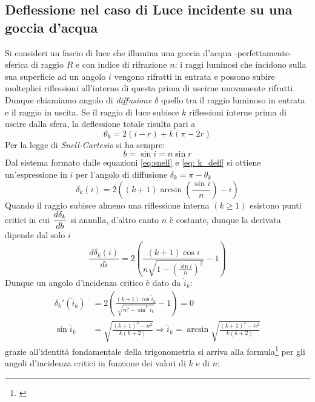 \documentclass{report}[a4paper,11pt]
\begin{document}
\subsection{Deflessione nel caso di Luce incidente su una goccia d'acqua}
Si consideri un fascio di luce che illumina una goccia d'acqua -perfettamente- sferica di raggio $R$ e con indice di rifrazione $n$: i raggi luminosi che incidono sulla sua superficie ad un angolo $i$ vengono rifratti in entrata e possono subire molteplici riflessioni all'interno di questa prima di uscirne nuovamente rifratti.
Dunque chiamiamo angolo di \emph{diffusione} $\delta$ quello tra il raggio luminoso in entrata e il raggio in uscita. 
Se il raggio di luce subisce $k$ riflessioni interne prima di uscire dalla sfera, la deflessione totale risulta pari a \begin{equation}\label{eq: k_defl}
\theta_k = 2(i-r) + k (\pi - 2r)
\end{equation}
Per la legge di \emph{Snell-Cartesio} si ha sempre:
\begin{equation}\label{eq:snell}
b = \sin{i} = n \sin{r}
\end{equation}
Dal sistema formato dalle equazioni \eqref{eq:snell} e \eqref{eq: k_defl} si ottiene un'espressione in $i$ per l'angolo di diffusione $\delta_k = \pi - \theta_k$
\begin{equation}\label{eq: defl(iota)}
\delta_k(i) = 2\left( (k+1)\arcsin \left(\frac{\sin{i}}{n}\right) -i \right)
\end{equation}
Quando il raggio subisce almeno una riflessione interna $(k\geq 1)$ esistono punti critici in cui $\mathlarger{\frac{d\delta_k}{db}}$ si annulla, d'altro canto $n$ è costante, dunque la derivata dipende dal solo $i$
\begin{equation}
\frac{d \delta_k(i)}{d i} = 2 \left( \frac{(k+1) \cos{i}}{n \sqrt{1 - \left(\frac{\sin{i}}{n}\right)^2}} -1\right)
\end{equation}
Dunque un angolo d'incidenza critico è dato da $\hat{i}_k$:
\begin{align}
\delta_k'(\hat{i}_k) &= 2\left(\frac{(k+1) \cos{\hat{i}_k}}{\sqrt{n^2 - \sin^2{\hat{i}_k}}} - 1 \right) = 0 \\
\sin{\hat{i}_k} &= \sqrt{\frac{(k+1)^2 - n^2}{k(k+2)}} \Rightarrow \hat{i}_k = \arcsin{\sqrt{\frac{(k+1)^2 - n^2}{k(k+2)}}}
\end{align}
grazie all'identità fondamentale della trigonometria si arriva alla formula\footnote{\cite{Walker}} per gli angoli d'incidenza critici in funzione dei valori di $k$ e di $n$:
\end{document}
